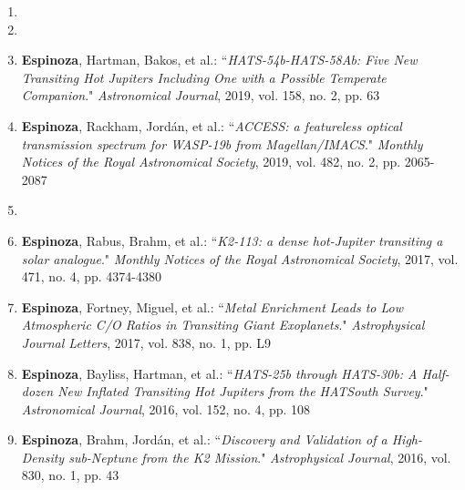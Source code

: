 \documentclass[12pt, a4paper]{article} %
\begin{document}
\begin{flushleft}
\begin{enumerate}
\item  {}

\item {}

\item \textbf{Espinoza}, Hartman, Bakos, et al.: ``\textit{HATS-54b-HATS-58Ab: Five New Transiting Hot Jupiters Including One with a Possible Temperate Companion}." \textit{Astronomical Journal}, 2019, vol. 158, no. 2, pp. 63

\item \textbf{Espinoza}, Rackham, Jordán, et al.: ``\textit{ACCESS: a featureless optical transmission spectrum for WASP-19b from Magellan/IMACS}." \textit{Monthly Notices of the Royal Astronomical Society}, 2019, vol. 482, no. 2, pp. 2065-2087

\item  {}

\item \textbf{Espinoza}, Rabus, Brahm, et al.: ``\textit{K2-113: a dense hot-Jupiter transiting a solar analogue}." \textit{Monthly Notices of the Royal Astronomical Society}, 2017, vol. 471, no. 4, pp. 4374-4380

\item \textbf{Espinoza}, Fortney, Miguel, et al.: ``\textit{Metal Enrichment Leads to Low Atmospheric C/O Ratios in Transiting Giant Exoplanets}." \textit{Astrophysical Journal Letters}, 2017, vol. 838, no. 1, pp. L9

\item \textbf{Espinoza}, Bayliss, Hartman, et al.: ``\textit{HATS-25b through HATS-30b: A Half-dozen New Inflated Transiting Hot Jupiters from the HATSouth Survey}." \textit{Astronomical Journal}, 2016, vol. 152, no. 4, pp. 108

\item \textbf{Espinoza}, Brahm, Jordán, et al.: ``\textit{Discovery and Validation of a High-Density sub-Neptune from the K2 Mission}." \textit{Astrophysical Journal}, 2016, vol. 830, no. 1, pp. 43


\end{enumerate}
\end{flushleft}
\end{document}
